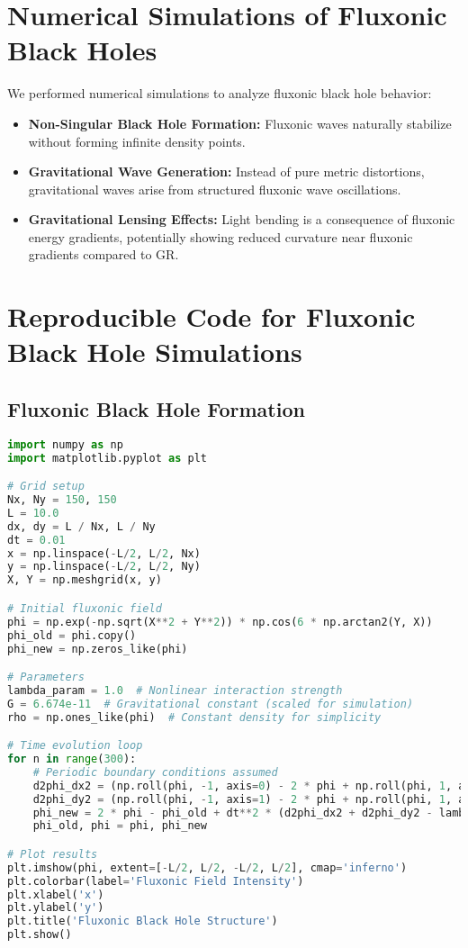 \documentclass{article}
\begin{document}
\section{Numerical Simulations of Fluxonic Black Holes}
We performed numerical simulations to analyze fluxonic black hole behavior:
\begin{itemize}
    \item \textbf{Non-Singular Black Hole Formation:} Fluxonic waves naturally stabilize without forming infinite density points.
    \item \textbf{Gravitational Wave Generation:} Instead of pure metric distortions, gravitational waves arise from structured fluxonic wave oscillations.
    \item \textbf{Gravitational Lensing Effects:} Light bending is a consequence of fluxonic energy gradients, potentially showing reduced curvature near fluxonic gradients compared to GR.
\end{itemize}

\section{Reproducible Code for Fluxonic Black Hole Simulations}
\subsection{Fluxonic Black Hole Formation}
\begin{lstlisting}[language=Python, caption=Fluxonic Black Hole Formation, label=lst:blackhole]
import numpy as np
import matplotlib.pyplot as plt

# Grid setup
Nx, Ny = 150, 150
L = 10.0
dx, dy = L / Nx, L / Ny
dt = 0.01
x = np.linspace(-L/2, L/2, Nx)
y = np.linspace(-L/2, L/2, Ny)
X, Y = np.meshgrid(x, y)

# Initial fluxonic field
phi = np.exp(-np.sqrt(X**2 + Y**2)) * np.cos(6 * np.arctan2(Y, X))
phi_old = phi.copy()
phi_new = np.zeros_like(phi)

# Parameters
lambda_param = 1.0  # Nonlinear interaction strength
G = 6.674e-11  # Gravitational constant (scaled for simulation)
rho = np.ones_like(phi)  # Constant density for simplicity

# Time evolution loop
for n in range(300):
    # Periodic boundary conditions assumed
    d2phi_dx2 = (np.roll(phi, -1, axis=0) - 2 * phi + np.roll(phi, 1, axis=0)) / dx**2
    d2phi_dy2 = (np.roll(phi, -1, axis=1) - 2 * phi + np.roll(phi, 1, axis=1)) / dy**2
    phi_new = 2 * phi - phi_old + dt**2 * (d2phi_dx2 + d2phi_dy2 - lambda_param * phi**3 + 8 * np.pi * G * rho)
    phi_old, phi = phi, phi_new

# Plot results
plt.imshow(phi, extent=[-L/2, L/2, -L/2, L/2], cmap='inferno')
plt.colorbar(label='Fluxonic Field Intensity')
plt.xlabel('x')
plt.ylabel('y')
plt.title('Fluxonic Black Hole Structure')
plt.show()
\end{lstlisting}
\end{document}
